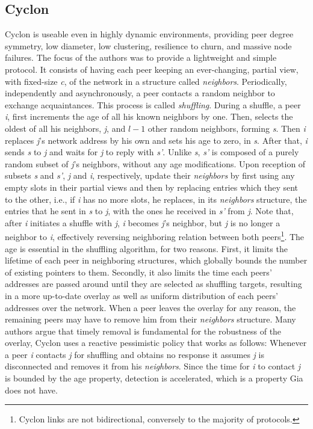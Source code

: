 \documentclass[runningheads]{llncs}
\begin{document}
\subsection{Cyclon} Cyclon\cite{cyclon} is useable even in highly dynamic environments, providing peer degree symmetry, low diameter, low clustering, resilience to churn, and massive node failures. The focus of the authors was to provide a lightweight and simple protocol. It consists of having each peer keeping an ever-changing, partial view, with fixed-size \textit{c}, of the network in a structure called \textit{neighbors}. Periodically, independently and asynchronously, a peer contacts a random neighbor to exchange acquaintances. This process is called \textit{shuffling}. During a shuffle, a peer \textit{i}, first increments the age of all his known neighbors by one. Then, selects the oldest of all his neighbors, \textit{j}, and $l-1$ other random neighbors, forming \textit{s}. Then \textit{i} replaces \textit{j}'s network address by his own and sets his age to zero, in \textit{s}. After that, \textit{i} sends \textit{s} to \textit{j} and waits for \textit{j} to reply with \textit{s'}. Unlike \textit{s}, \textit{s'} is composed of a purely random subset of \textit{j}'s neighbors, without any age modifications. Upon reception of subsets \textit{s} and \textit{s'}, \textit{j} and \textit{i}, respectively, update their \textit{neighbors} by first using any empty slots in their partial views and then by replacing entries which they sent to the other, i.e., if \textit{i} has no more slots, he replaces, in its \textit{neighbors} structure, the entries that he sent in \textit{s} to \textit{j}, with the ones he received in \textit{s'} from \textit{j}. Note that, after \textit{i} initiates a shuffle with \textit{j}, \textit{i} becomes \textit{j}'s neighbor, but \textit{j} is no longer a neighbor to \textit{i}, effectively reversing neighboring relation between both peers\footnote{Cyclon links are not bidirectional, conversely to the majority of protocols.}. The age is essential in the shuffling algorithm, for two reasons. First, it limits the lifetime of each peer in neighboring structures, which globally bounds the number of existing pointers to them. Secondly, it also limits the time each peers' addresses are passed around until they are selected as shuffling targets, resulting in a more up-to-date overlay as well as uniform distribution of each peers' addresses over the network. When a peer leaves the overlay for any reason, the remaining peers may have to remove him from their \textit{neighbors} structure. Many authors argue that timely removal is fundamental for the robustness of the overlay, Cyclon uses a reactive pessimistic policy that works as follows: Whenever a peer \textit{i} contacts \textit{j} for shuffling and obtains no response it assumes \textit{j} is disconnected and removes it from his \textit{neighbors}. Since the time for \textit{i} to contact \textit{j} is bounded by the age property, detection is accelerated, which is a property Gia does not have.
\end{document}
